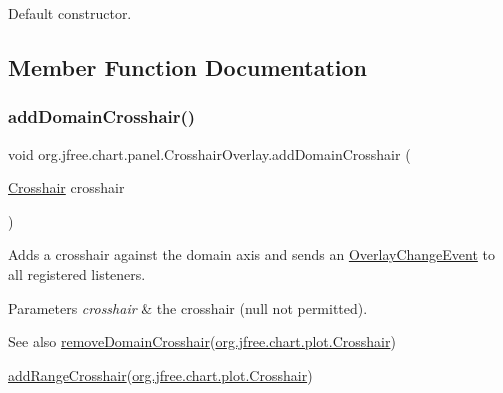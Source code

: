 Default constructor. 

\subsection{Member Function Documentation}
\mbox{\label{classorg_1_1jfree_1_1chart_1_1panel_1_1_crosshair_overlay_adebe4aa34a8545726d6dd708a6daf1d9}} 
\subsubsection{\texorpdfstring{add\+Domain\+Crosshair()}{addDomainCrosshair()}}
{\footnotesize\ttfamily void org.\+jfree.\+chart.\+panel.\+Crosshair\+Overlay.\+add\+Domain\+Crosshair (\begin{DoxyParamCaption}\item[{\mbox{\hyperlink{classorg_1_1jfree_1_1chart_1_1plot_1_1_crosshair}{Crosshair}}}]{crosshair }\end{DoxyParamCaption})}

Adds a crosshair against the domain axis and sends an \mbox{\hyperlink{}{Overlay\+Change\+Event}} to all registered listeners.


\begin{DoxyParams}{Parameters}
{\em crosshair} & the crosshair ({\ttfamily null} not permitted).\\
\hline
\end{DoxyParams}
\begin{DoxySeeAlso}{See also}
\mbox{\hyperlink{classorg_1_1jfree_1_1chart_1_1panel_1_1_crosshair_overlay_a490077421ff18c59b996fb68a6fcc8fd}{remove\+Domain\+Crosshair}}(\mbox{\hyperlink{classorg_1_1jfree_1_1chart_1_1plot_1_1_crosshair}{org.\+jfree.\+chart.\+plot.\+Crosshair}}) 

\mbox{\hyperlink{classorg_1_1jfree_1_1chart_1_1panel_1_1_crosshair_overlay_a646be9e4b9ab7774b97949a0c9f475a9}{add\+Range\+Crosshair}}(\mbox{\hyperlink{classorg_1_1jfree_1_1chart_1_1plot_1_1_crosshair}{org.\+jfree.\+chart.\+plot.\+Crosshair}}) 
\end{DoxySeeAlso}
\mbox{\label{classorg_1_1jfree_1_1chart_1_1panel_1_1_crosshair_overlay_a646be9e4b9ab7774b97949a0c9f475a9}} 
